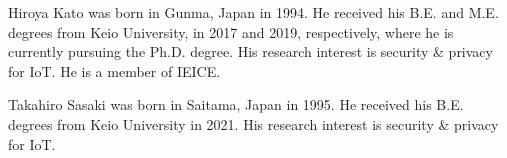 \documentclass{ieeeaccess}
\begin{document}


\begin{IEEEbiography}{Hiroya Kato} was born in Gunma, Japan in 1994. He received his B.E. and M.E. degrees from Keio University, in 2017 and 2019, respectively, where he is currently pursuing the Ph.D. degree. His research interest is security \& privacy for IoT. He is a member of IEICE.
\end{IEEEbiography} 

\begin{IEEEbiography}{Takahiro Sasaki} was born in Saitama, Japan in 1995. He received his B.E. degrees from Keio University in 2021. His research interest is security \& privacy for IoT.
\end{IEEEbiography}
\end{document}
